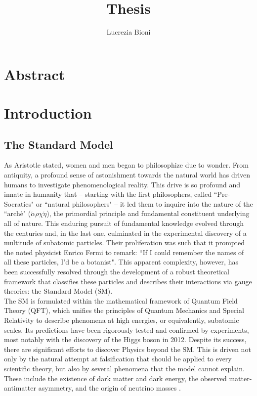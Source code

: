 \documentclass[a4paper, 12pt]{book}
\title{Thesis}
\author{Lucrezia Bioni}
\begin{document}
\frontmatter

\clearpage

\chapter*{Abstract}


\newpage

\pagestyle{contents}

\toc

\restoregeometry
\pagestyle{body}

\mainmatter


\chapter{Introduction}

\section{The Standard Model}


As Aristotle stated, women and men began to philosophize due to wonder. From antiquity, a profound sense of astonishment towards the natural world has driven humans to investigate phenomenological reality. This drive is so profound and innate in humanity that – starting with the first philosophers, called ``Pre-Socratics"  or ``natural philosophers" – it led them to inquire into the nature of the ``archè" ($\acute{\alpha}\rho\chi\acute{\eta}$), the primordial principle and fundamental constituent underlying all of nature. This enduring pursuit of fundamental knowledge evolved through the centuries and, in the last one, culminated in the experimental discovery of a multitude of subatomic particles. Their proliferation was such that it prompted the noted physicist Enrico Fermi to remark: ``If I could remember the names of all these particles, I'd be a botanist". This apparent complexity, however, has been successfully resolved through the development of a robust theoretical framework that classifies these particles and describes their interactions via gauge theories: the Standard Model (SM). \\
The SM is formulated within the mathematical framework of Quantum Field Theory (QFT), which unifies the principles of Quantum Mechanics and Special Relativity to describe phenomena at high energies, or equivalently, subatomic scales. Its predictions have been rigorously tested and confirmed by experiments, most notably with the discovery of the Higgs boson in 2012.  Despite its success, there are significant efforts to discover Physics beyond the SM. This is driven not only by the natural attempt at falsification that should be applied to every scientific theory, but also by several phenomena that the model cannot explain. These include the existence of dark matter and dark energy, the observed matter-antimatter asymmetry, and the origin of neutrino masses \cite{Campbell:2017}. \\
\end{document}
